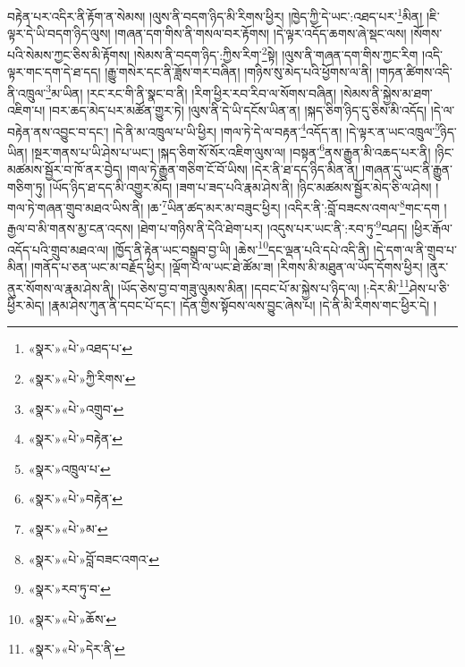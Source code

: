 བརྟེན་པར་འདིར་ནི་རྟོག་ན་སེམས། །ལུས་ནི་བདག་ཉིད་མི་རིགས་ཕྱིར། །ཁྱེད་ཀྱི་དེ་ཡང་:འཐད་པར་\footnote{«སྣར་»«པེ་»འཐད་པ་}མིན། །ཇི་ལྟར་དེ་ཡི་བདག་ཉིད་ལུས། །གཞན་དག་གིས་ནི་གསལ་བར་རྟོགས། །དེ་ལྟར་འདོད་ཆགས་ཞེ་སྡང་ལས། །སོགས་པའི་སེམས་ཀྱང་ཅིས་མི་རྟོགས། །སེམས་ནི་བདག་ཉིད་:ཀྱིས་རིག་\footnote{«སྣར་»«པེ་»ཀྱི་རིགས་}སྟེ། །ལུས་ནི་གཞན་དག་གིས་ཀྱང་རིག །འདི་ལྟར་གང་དག་དེ་ཐ་དད། །རྒྱུ་གསེར་དང་ནི་ཟློས་གར་བཞིན། །གཉིས་སུ་མེད་པའི་ཕྱོགས་ལ་ནི། །གཏན་ཚིགས་འདི་ནི་འཁྲུལ་\footnote{«སྣར་»«པེ་»འགྲུབ་}མ་ཡིན། །རང་རང་གི་ནི་སྣང་བ་ནི། །རིག་ཕྱིར་རབ་རིབ་ལ་སོགས་བཞིན། །སེམས་ནི་སྐྱེས་མ་ཐག་འཇིག་པ། །བར་ཆད་མེད་པར་མཚོན་གྱུར་ཏེ། །ལུས་ནི་དེ་ཡི་དངོས་ཡིན་ན། །སྐད་ཅིག་ཉིད་དུ་ཅིས་མི་འདོད། །དེ་ལ་བརྟེན་ནས་འབྱུང་བ་དང་། །དེ་ནི་མ་འཁྲུལ་པ་ཡི་ཕྱིར། །གལ་ཏེ་དེ་ལ་བརྟན་\footnote{«སྣར་»«པེ་»བརྟེན་}འདོད་ན། །དེ་ལྟར་ན་ཡང་འཁྲུལ་\footnote{«སྣར་»འཁྲུལ་པ་}ཉིད་ཡིན། །སྔར་གནས་པ་ཡི་ཤེས་པ་ཡང་། །སྐད་ཅིག་སོ་སོར་འཇིག་ལུས་ལ། །བསྟན་\footnote{«སྣར་»«པེ་»བརྟེན་}ནས་རྒྱུན་མི་འཆད་པར་ནི། །ཉིང་མཚམས་སྦྱོར་བ་ཁོ་ནར་བྱེད། །གལ་ཏེ་རྒྱུན་གཅིག་ངོ་བོ་ཡིས། །དེར་ནི་ཐ་དད་ཉིད་མིན་ན། །གཞན་དུ་ཡང་ནི་རྒྱུན་གཅིག་ཏུ། །ཡོད་ཉིད་ཐ་དད་མི་འགྱུར་མོད། །ཟག་པ་ཟད་པའི་རྣམ་ཤེས་ནི། །ཉིང་མཚམས་སྦྱོར་མེད་ཅི་ལ་ཤེས། །གལ་ཏེ་གཞན་གྲུབ་མཐའ་ཡིས་ནི། །ཆ་\footnote{«སྣར་»«པེ་»མ་}ཡིན་ཚད་མར་མ་བཟུང་ཕྱིར། །འདིར་ནི་:བློ་བཟངས་འགལ་\footnote{«སྣར་»«པེ་»བློ་བཟང་འགའ་}གང་དག །རྒྱལ་བ་མི་གནས་མྱ་ངན་འདས། །ཐེག་པ་གཉིས་ནི་དེའི་ཐེག་པར། །འདུས་པར་ཡང་ནི་:རབ་ཏུ་\footnote{«སྣར་»རབ་ཏུ་བ་}བཤད། །ཕྱིར་རྒོལ་འདོད་པའི་གྲུབ་མཐའ་ལ། །ཁྱོད་ནི་རྟེན་ཡང་བསྒྲུབ་བྱ་ཡི། །ཆེས་\footnote{«སྣར་»«པེ་»ཆོས་}དང་ལྡན་པའི་དཔེ་འདི་ནི། །དེ་དག་ལ་ནི་གྲུབ་པ་མིན། །གནོད་པ་ཅན་ཡང་མ་བརྗོད་ཕྱིར། །ལྡོག་པ་ལ་ཡང་ཐེ་ཚོམ་ཟ། །རིགས་མི་མཐུན་ལ་ཡོད་དོགས་ཕྱིར། །ནུར་ནུར་སོགས་ལ་རྣམ་ཤེས་ནི། །ཡོད་ཅེས་བྱ་བ་གཟུ་ལུམས་མིན། །དབང་པོ་མ་སྐྱེས་པ་ཉིད་ལ། །:དེར་མི་\footnote{«སྣར་»«པེ་»དེར་ནི་}ཤེས་པ་ཅི་ཕྱིར་མེད། །རྣམ་ཤེས་ཀུན་ནི་དབང་པོ་དང་། །དོན་གྱིས་སྟོབས་ལས་བྱུང་ཞེས་པ། །དེ་ནི་མི་རིགས་གང་ཕྱིར་དེ། །

